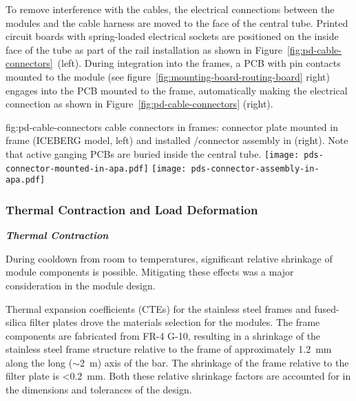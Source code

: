 To remove interference with the  cables, the electrical connections between the  modules and the  cable harness are moved to the face of the central  tube.  Printed circuit boards with spring-loaded electrical sockets are positioned on the inside face of the tube as part of the  rail installation as shown in Figure~\ref{fig:pd-cable-connectors}~(left).  During  integration into the  frames, a PCB with pin contacts mounted to the  module (see figure~\ref{fig:mounting-board-routing-board} right) engages into the PCB mounted to the  frame, automatically making the electrical connection as shown in 
Figure~\ref{fig:pd-cable-connectors} (right).


\begin{dunefigure}{fig:pd-cable-connectors}
{ cable connectors in  frames:  connector plate mounted in  frame (ICEBERG model, left) and installed /connector assembly in  (right).  Note that active ganging PCBs are buried inside the central tube.}
	\texttt{[image: pds-connector-mounted-in-apa.pdf]}
	\texttt{[image: pds-connector-assembly-in-apa.pdf]}
\end{dunefigure}

\subsubsection{Thermal Contraction and Load Deformation}
\label{sssec:pds-thermal-load}
\textit{\bf Thermal Contraction}

During cooldown from room 
to  temperatures,  significant relative shrinkage of module components is possible.  Mitigating these effects was a major consideration in the  module design.

Thermal expansion coefficients (CTEs) for the stainless steel  frames and fused-silica filter plates drove the materials selection for the  modules.  The frame components are fabricated from FR-4 G-10, resulting in a shrinkage of the stainless steel frame structure relative to the frame of approximately \SI{1.2}{mm} along the long ($\sim$\SI{2}{m}) axis of the bar.  The shrinkage of the frame relative to the filter plate is <\SI{0.2}{mm}.  Both these relative shrinkage factors are accounted for in the dimensions and tolerances of the design.

